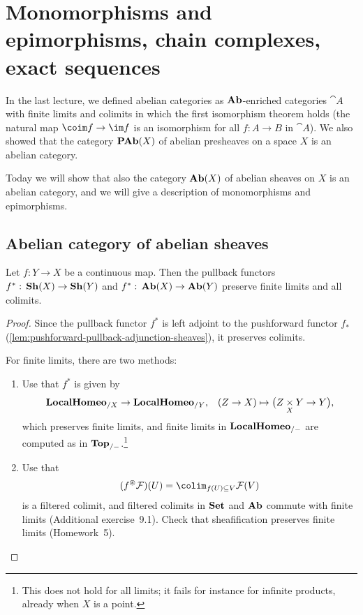 \chapter{Monomorphisms and epimorphisms, chain complexes, exact sequences}

In the last lecture, we defined abelian categories as \(\mathbf{Ab}\)-enriched categories \(\cat A\) with finite limits and colimits in which the first isomorphism theorem holds (the natural map \(\coim f\to\im f\) is an isomorphism for all \(f\colon A\to B\) in \(\cat A\)).
We also showed that the category \(\operatorname{\mathbf{PAb}}(X)\) of abelian presheaves on a space \(X\) is an abelian category.

Today we will show that also the category \(\operatorname{\mathbf{Ab}}(X)\) of abelian sheaves on \(X\) is an abelian category, and we will give a description of monomorphisms and epimorphisms.

\section{Abelian category of abelian sheaves}

\begin{lem}\label{lem:pullback-preserves-colimits-and-finite-limits}
Let \(f\colon Y\to X\) be a continuous map.
Then the pullback functors \(f^*\colon\catSheaf(X)\to\catSheaf(Y)\) and \(f^*\colon\catAbelianSheaf(X)\to\catAbelianSheaf(Y)\) preserve finite limits and all colimits.
\end{lem}
\begin{proof}
Since the pullback functor \(f^*\) is left adjoint to the pushforward functor \(f_*\) (\cref{lem:pushforward-pullback-adjunction-sheaves}), it preserves colimits.

For finite limits, there are two methods:
\begin{enumerate}
\item Use that \(f^*\) is given by
  \[\catLocalHomeomorphism_{/X}\to\catLocalHomeomorphism_{/Y}\text{,} \quad (Z\to X) \mapsto \bigl(Z\pullback{X}Y\to Y\bigr)\text{,} \]
  which preserves finite limits, and finite limits in \(\mathbf{LocalHomeo}_{/-}\) are computed as in \(\mathbf{Top}_{/-}\).\footnote{This does not hold for all limits; it fails for instance for infinite products, already when \(X\) is a point.}
\item Use that
  \[(f^\circledast\mathcal F)(U) = \colim_{f(U)\subseteq V}\mathcal F(V) \]
  is a filtered colimit, and filtered colimits in \(\mathbf{Set}\) and \(\mathbf{Ab}\) commute with finite limits (Additional exercise~9.1).
  Check that sheafification preserves finite limits (Homework~5).
  \qedhere
\end{enumerate}
\end{proof}

